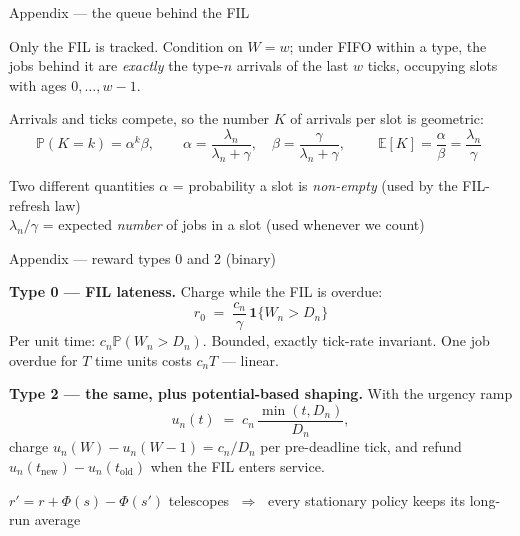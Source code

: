 \documentclass[12pt,aspectratio=169]{beamer}
\newcommand{\Prob}{\mathbb{P}}
\begin{document}
\begin{frame}{Appendix --- the queue behind the FIL}

Only the FIL is tracked.  Condition on $W = w$; under FIFO within a type, the
jobs behind it are \emph{exactly} the type-$n$ arrivals of the last $w$ ticks,
occupying slots with ages $0,\dots,w-1$.

\vfill
Arrivals and ticks compete, so the number $K$ of arrivals per slot is geometric:
\[
  \Prob(K = k) = \alpha^k\beta,
  \qquad
  \alpha = \frac{\lambda_n}{\lambda_n+\gamma},
  \quad
  \beta = \frac{\gamma}{\lambda_n+\gamma},
  \qquad
  \boxed{\;\mathbb{E}[K] = \frac{\alpha}{\beta} = \frac{\lambda_n}{\gamma}\;}
\]

\vfill
\begin{block}{Two different quantities}
$\alpha$ = probability a slot is \emph{non-empty} \quad(used by the FIL-refresh law) \\
$\lambda_n/\gamma$ = expected \emph{number} of jobs in a slot \quad(used whenever we count)
\end{block}

\end{frame}

\begin{frame}{Appendix --- reward types 0 and 2 (binary)}

\textbf{Type 0 --- FIL lateness.}  Charge while the FIL is overdue:
\[
  r_0 \;=\; \frac{c_n}{\gamma}\,\mathbf{1}\{W_n > D_n\}
\]
Per unit time: $c_n \Prob(W_n > D_n)$.  Bounded, exactly tick-rate invariant.
One job overdue for $T$ time units costs $c_n T$ --- linear.

\vfill
\textbf{Type 2 --- the same, plus potential-based shaping.}  With the urgency ramp
\[
  u_n(t) \;=\; c_n\,\frac{\min(t, D_n)}{D_n},
\]
charge $u_n(W) - u_n(W-1) = c_n/D_n$ per pre-deadline tick, and refund
$u_n(t_{\text{new}}) - u_n(t_{\text{old}})$ when the FIL enters service.

\vfill
\begin{block}{}
\centering
$r' = r + \Phi(s) - \Phi(s')$ telescopes $\;\Rightarrow\;$ every stationary policy
keeps its long-run average
\end{block}

\end{frame}
\end{document}

